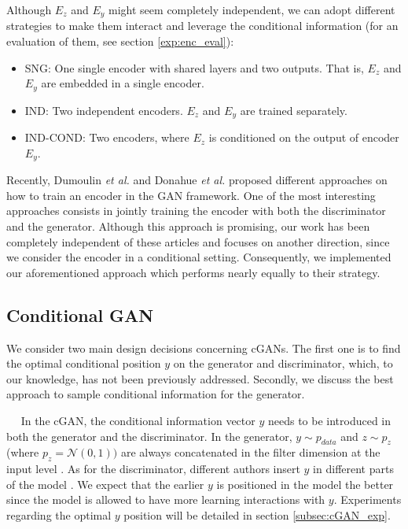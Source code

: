 \documentclass{article}
\newcommand{\minisection}[1]{\vspace{0.04in} \noindent {\bf #1}\ \ }
\begin{document}
Although $E_z$ and $E_y$ might seem completely independent, we can adopt different strategies to make them interact and leverage the conditional information (for an evaluation of them, see section \ref{exp:enc_eval}): 
\begin{itemize}
\item SNG: One single encoder with shared layers and two outputs. That is, $E_z$ and $E_y$ are embedded in a single encoder.
\item IND: Two independent encoders. $E_z$ and $E_y$ are trained separately.
\item IND-COND: Two encoders, where $E_z$ is conditioned on the output of encoder $E_y$.
\end{itemize}

Recently, Dumoulin \textit{et al.} \citep{Dumoulin2016} and Donahue \textit{et al.} \citep{Donahue2016} proposed different approaches on how to train an encoder in the GAN framework. One of the most interesting approaches consists in jointly training the encoder with both the discriminator and the generator.
Although this approach is promising, our work has been completely independent of these articles and  focuses on another direction, since we consider the encoder in a conditional setting. Consequently, we implemented our aforementioned approach which performs nearly equally \citep{Donahue2016} to their strategy.

\subsection{Conditional GAN} \label{icgan:cgan}
We consider two main design decisions concerning cGANs. The first one is to find the optimal conditional position $y$ on the generator and discriminator, which, to our knowledge, has not been previously addressed. Secondly, we discuss the best approach to sample conditional information for the generator.

\minisection{Conditional position}
In the cGAN, the conditional information vector $y$ needs to be introduced in both the generator and the discriminator. In the generator, $y \sim p_{data}$ and $z \sim p_z$ (where $p_z=\mathcal{N}(0,1))$ are always concatenated in the filter dimension at the input level \citep{Reed2016,Mirza2014,Gauthier2014}. As for the discriminator, different authors insert $y$ in different parts of the model \citep{Reed2016,Mirza2014,Gauthier2014}. We expect that the earlier $y$ is positioned in the model the better since the model is allowed to have more learning interactions with $y$. Experiments regarding the optimal $y$ position will be detailed in section \ref{subsec:cGAN_exp}.
\end{document}
